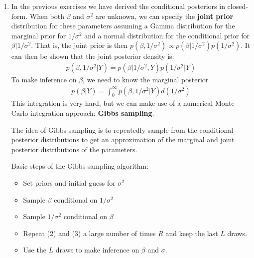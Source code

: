 \begin{enumerate}
\item In the previous exercises we have derived the conditional posteriors in closed-form.
When both \(\beta \) and \(\sigma^2\) are unknown,
  we can specify the \textbf{joint prior} distribution for these parameters assuming a Gamma distribution for the marginal prior for \(1/\sigma^2\)
  and a normal distribution for the conditional prior for \(\beta|1/\sigma^2\).
That is, the joint prior is then \(p(\beta, 1/\sigma^2) \propto p(\beta|1/\sigma^2) p(1/\sigma^2)\).
It can then be shown that the joint posterior density is:
\begin{align*}
p(\beta,1/\sigma^2|Y) = p(\beta|1/\sigma^2,Y) p(1/\sigma^2|Y)
\end{align*}
To make inference on \(\beta \), we need to know the marginal posterior
\begin{align*}
p(\beta|Y) = \int_0^\infty p(\beta,1/\sigma^2|Y) d(1/\sigma^2)
\end{align*}
This integration is very hard, but we can make use of a numerical Monte Carlo integration approach:
\textbf{Gibbs sampling}.

The idea of Gibbs sampling is to repeatedly sample from the conditional posterior distributions
to get an approximation of the marginal and joint posterior distributions of the parameters.

Basic steps of the Gibbs sampling algorithm:
\begin{itemize}
	\item Set priors and initial guess for \(\sigma^2\)
	\item Sample \(\beta \) conditional on \(1/\sigma^2\)
	\item Sample \(1/\sigma^2\) conditional on \(\beta \)
	\item Repeat (2) and (3) a large number of times \(R\) and keep the last \(L\) draws.
	\item Use the \(L\) draws to make inference on \(\beta \) and \(\sigma \).
\end{itemize}
\end{enumerate}